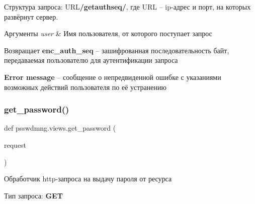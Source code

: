 Структура запроса\+: {\ttfamily U\+RL{\bfseries /getauthseq/}}, где {\ttfamily U\+RL} – ip-\/адрес и порт, на которых развёрнут сервер. 
\begin{DoxyParams}{Аргументы}
{\em user} & Имя пользователя, от которого поступает запрос \\
\hline
\end{DoxyParams}
\begin{DoxyReturn}{Возвращает}
{\bfseries enc\+\_\+auth\+\_\+seq} – зашифрованная последовательность байт, передаваемая пользователю для аутентификации запроса 

{\bfseries Error message} – сообщение о непредвиденной ошибке с указаниями возможных действий пользователя по её устранению 
\end{DoxyReturn}
\mbox{\label{namespacepsswdmng_1_1views_ac84061d736cf49b655050b89b9e2fe2a}} 
\subsubsection{get\+\_\+password()}
{\footnotesize\ttfamily def psswdmng.\+views.\+get\+\_\+password (\begin{DoxyParamCaption}\item[{}]{request }\end{DoxyParamCaption})}



Обработчик http-\/запроса на выдачу пароля от ресурса 

Тип запроса\+: {\bfseries G\+ET} 

